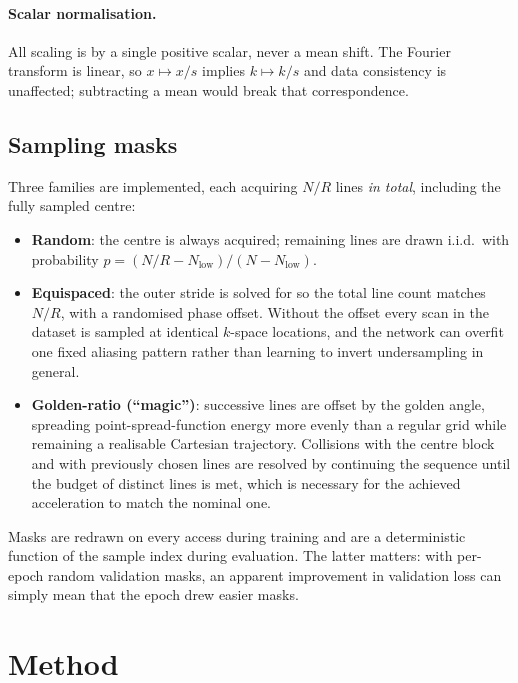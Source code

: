 \documentclass[11pt]{article}
\begin{document}
\paragraph{Scalar normalisation.} All scaling is by a single positive scalar,
never a mean shift. The Fourier transform is linear, so $x \mapsto x/s$ implies
$k \mapsto k/s$ and data consistency is unaffected; subtracting a mean would
break that correspondence.

\subsection{Sampling masks}

Three families are implemented, each acquiring $N/R$ lines \emph{in total},
including the fully sampled centre:

\begin{itemize}
  \item \textbf{Random}: the centre is always acquired; remaining lines are
        drawn i.i.d.\ with probability
        $p = (N/R - N_{\text{low}}) / (N - N_{\text{low}})$.
  \item \textbf{Equispaced}: the outer stride is solved for so the total line
        count matches $N/R$, with a randomised phase offset. Without the offset
        every scan in the dataset is sampled at identical $k$-space locations,
        and the network can overfit one fixed aliasing pattern rather than
        learning to invert undersampling in general.
  \item \textbf{Golden-ratio (``magic'')}: successive lines are offset by the
        golden angle, spreading point-spread-function energy more evenly than a
        regular grid while remaining a realisable Cartesian trajectory.
        Collisions with the centre block and with previously chosen lines are
        resolved by continuing the sequence until the budget of distinct lines
        is met, which is necessary for the achieved acceleration to match the
        nominal one.
\end{itemize}

Masks are redrawn on every access during training and are a deterministic
function of the sample index during evaluation. The latter matters: with
per-epoch random validation masks, an apparent improvement in validation loss
can simply mean that the epoch drew easier masks.

\section{Method}
\end{document}
